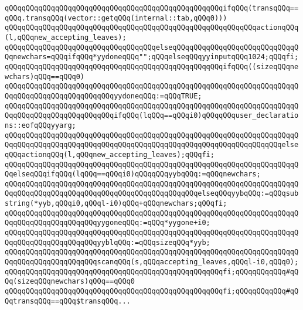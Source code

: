 \verb|qQQqqQQqqQQqqQQqqQQqqQQqqQQqqQQqqQQqqQQqqQQqqQQqqQQqifqQQq(transqQQq==qQQq.transqQQq(vector::getqQQq(internal::tab,qQQq0)))|\newline
\verb|qQQqqQQqqQQqqQQqqQQqqQQqqQQqqQQqqQQqqQQqqQQqqQQqqQQqqQQqqQQqactionqQQq(l,qQQqnew_accepting_leaves);|\newline
\verb|qQQqqQQqqQQqqQQqqQQqqQQqqQQqqQQqqQQqelseqQQqqQQqqQQqqQQqqQQqqQQqqQQqqQQqnewchars=qQQqifqQQq*yydoneqQQq"";qQQqelseqQQqyyinputqQQq1024;qQQqfi;|\newline
\verb|qQQqqQQqqQQqqQQqqQQqqQQqqQQqqQQqqQQqqQQqqQQqqQQqqQQqifqQQq((sizeqQQqnewchars)qQQq==qQQq0)|\newline
\verb|qQQqqQQqqQQqqQQqqQQqqQQqqQQqqQQqqQQqqQQqqQQqqQQqqQQqqQQqqQQqqQQqqQQqqQQqqQQqqQQqqQQqqQQqqQQqqQQqyydoneqQQq:=qQQqTRUE;|\newline
\verb|qQQqqQQqqQQqqQQqqQQqqQQqqQQqqQQqqQQqqQQqqQQqqQQqqQQqqQQqqQQqqQQqqQQqqQQqqQQqqQQqqQQqqQQqqQQqqQQqifqQQq(lqQQq==qQQqi0)qQQqqQQquser_declarations::eofqQQqyyarg;|\newline
\verb|qQQqqQQqqQQqqQQqqQQqqQQqqQQqqQQqqQQqqQQqqQQqqQQqqQQqqQQqqQQqqQQqqQQqqQQqqQQqqQQqqQQqqQQqqQQqqQQqqQQqqQQqqQQqqQQqqQQqqQQqqQQqqQQqqQQqqQQqelseqQQqactionqQQq(l,qQQqnew_accepting_leaves);qQQqfi;|\newline
\verb|qQQqqQQqqQQqqQQqqQQqqQQqqQQqqQQqqQQqqQQqqQQqqQQqqQQqqQQqqQQqqQQqqQQqqQQqelseqQQqifqQQq(lqQQq==qQQqi0)qQQqqQQqyybqQQq:=qQQqnewchars;|\newline
\verb|qQQqqQQqqQQqqQQqqQQqqQQqqQQqqQQqqQQqqQQqqQQqqQQqqQQqqQQqqQQqqQQqqQQqqQQqqQQqqQQqqQQqqQQqqQQqqQQqqQQqqQQqqQQqqQQqqQQqelseqQQqyybqQQq:=qQQqsubstring(*yyb,qQQqi0,qQQql-i0)qQQq+qQQqnewchars;qQQqfi;|\newline
\verb|qQQqqQQqqQQqqQQqqQQqqQQqqQQqqQQqqQQqqQQqqQQqqQQqqQQqqQQqqQQqqQQqqQQqqQQqqQQqqQQqqQQqqQQqqQQqyygoneqQQq:=qQQq*yygone+i0;|\newline
\verb|qQQqqQQqqQQqqQQqqQQqqQQqqQQqqQQqqQQqqQQqqQQqqQQqqQQqqQQqqQQqqQQqqQQqqQQqqQQqqQQqqQQqqQQqqQQqyyblqQQq:=qQQqsizeqQQq*yyb;|\newline
\verb|qQQqqQQqqQQqqQQqqQQqqQQqqQQqqQQqqQQqqQQqqQQqqQQqqQQqqQQqqQQqqQQqqQQqqQQqqQQqqQQqqQQqqQQqqQQqscanqQQq(s,qQQqaccepting_leaves,qQQql-i0,qQQq0);|\newline
\verb|qQQqqQQqqQQqqQQqqQQqqQQqqQQqqQQqqQQqqQQqqQQqqQQqqQQqfi;qQQqqQQqqQQq#qQQq(sizeqQQqnewchars)qQQq==qQQq0|\newline
\verb|qQQqqQQqqQQqqQQqqQQqqQQqqQQqqQQqqQQqqQQqqQQqqQQqqQQqfi;qQQqqQQqqQQq#qQQqtransqQQq==qQQq$transqQQq...|\newline
